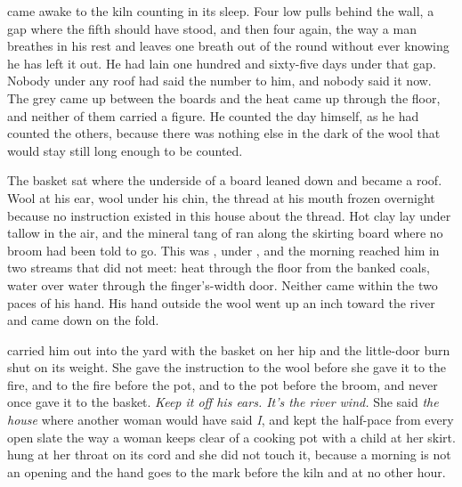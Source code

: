 
 came awake to the kiln counting in its sleep. Four low pulls behind the wall, a gap where the fifth should have stood, and then four again, the way a man breathes in his rest and leaves one breath out of the round without ever knowing he has left it out. He had lain one hundred and sixty-five days under that gap. Nobody under any roof had said the number to him, and nobody said it now. The grey came up between the boards and the heat came up through the floor, and neither of them carried a figure. He counted the day himself, as he had counted the others, because there was nothing else in the dark of the wool that would stay still long enough to be counted.

The basket sat where the underside of a board leaned down and became a roof. Wool at his ear, wool under his chin, the thread at his mouth frozen overnight because no instruction existed in this house about the thread. Hot clay lay under tallow in the air, and the mineral tang of  ran along the skirting board where no broom had been told to go. This was , under , and the morning reached him in two streams that did not meet: heat through the floor from the banked coals, water over water through the finger's-width door. Neither came within the two paces of his hand. His hand outside the wool went up an inch toward the river and came down on the fold.

 carried him out into the yard with the basket on her hip and the little-door burn shut on its weight. She gave the instruction to the wool before she gave it to the fire, and to the fire before the pot, and to the pot before the broom, and never once gave it to the basket. \emph{Keep it off his ears. It's the river wind.} She said \emph{the house} where another woman would have said \emph{I}, and kept the half-pace from every open slate the way a woman keeps clear of a cooking pot with a child at her skirt.  hung at her throat on its cord and she did not touch it, because a morning is not an opening and the hand goes to the mark before the kiln and at no other hour.

